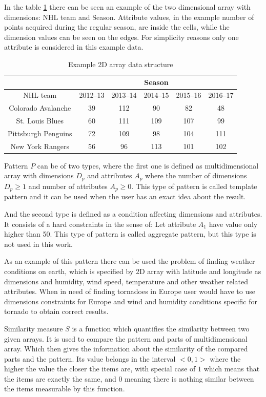 In the table \ref{tab1} there can be seen an example of the two dimensional array with dimensions: NHL team and Season. Attribute values, in the example number of points acquired during the regular season, are inside the cells, while the dimension values can be seen on the edges. For simplicity reasons only one attribute is considered in this example data. 
\begin{table}
\centering
\begin{tabular} {| c | c | c | c | c | c |}
\cline{2-6}
\multicolumn{1}{c|}{} & \multicolumn{5}{|c|}{Season} \\
\hline
NHL team & 2012--13 & 2013--14 & 2014--15 & 2015--16 & 2016--17\\
\hline
Colorado Avalanche & 39 & 112 & 90 & 82 & 48 \\
\hline
St. Louis Blues & 60 & 111 & 109 & 107 & 99 \\
\hline
Pittsburgh Penguins & 72 & 109 & 98 & 104 & 111 \\
\hline
New York Rangers & 56 & 96 & 113 & 101 & 102 \\
\hline

\end{tabular}
\caption{Example 2D array data structure}
\label{tab1}
\end{table}


Pattern $P$ can be of two types, where the first one is defined as multidimensional array with dimensions $D_p$ and attributes $A_p$ where the number of dimensions $D_p \geq 1$ and number of attributes $A_p \geq 0$.
This type of pattern is called template pattern and it can be used when the user has an exact idea about the result.

And the second type is defined as a condition affecting dimensions and attributes. It consists of a hard constraints in the sense of: Let attribute $A_1$ have value only higher than 50. This type of pattern is called aggregate pattern, but this type is not used in this work.
\newline

As an example of this pattern there can be used the problem of finding weather conditions on earth, which is specified by 2D array with latitude and longitude as dimensions and humidity, wind speed, temperature and other weather related attributes. When in need of finding tornadoes in Europe user would have to use dimensions constraints for Europe and wind and humidity conditions specific for tornado to obtain correct results.

Similarity measure $S$ is a function which quantifies the similarity between two given arrays. 
It is used to compare the pattern and parts of multidimensional array. Which then gives the information about the similarity of the compared parts and the pattern. Its value belongs in the interval $<0, 1>$ where the higher the value the closer the items are, with special case of $1$ which means that the items are exactly the same, and $0$ meaning there is nothing similar between the items measurable by this function.

